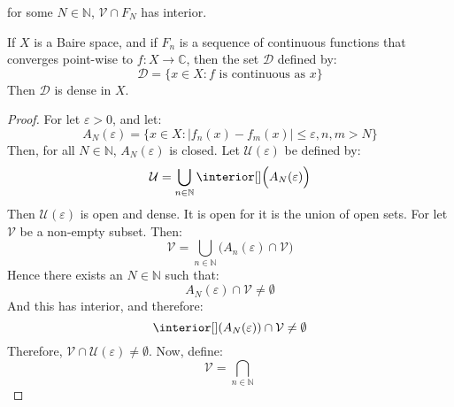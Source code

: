             for some $N\in\mathbb{N}$, $\mathcal{V}\cap{F}_{N}$ has
            interior.
            \begin{theorem}
            If $X$ is a Baire space, and if
            $F_{n}$ is a sequence of continuous functions that
            converges point-wise to $f:X\rightarrow\mathbb{C}$, then
            the set $\mathcal{D}$ defined by:
            \begin{equation}
                \mathcal{D}=
                    \{x\in{X}:\textrm{$f$ is continuous as $x$}\}
            \end{equation}
            Then $\mathcal{D}$ is dense in $X$.
        \end{theorem}
            \begin{proof}
            For let $\varepsilon>0$, and let:
            \begin{equation}
                A_{N}(\varepsilon)=
                \{x\in{X}:|f_{n}(x)-f_{m}(x)|\leq\varepsilon,n,m>N\}
            \end{equation}
            Then, for all $N\in\mathbb{N}$, $A_{N}(\varepsilon)$ is
            closed. Let $\mathcal{U}(\varepsilon)$ be defined by:
            \begin{equation}
                \mathcal{U}=\bigcup_{n\in\mathbb{N}}
                    \interior[]\Big(A_{N}(\varepsilon)\Big)
            \end{equation}
            Then $\mathcal{U}(\varepsilon)$ is open and dense. It
            is open for it is the union of open sets. For let
            $\mathcal{V}$ be a non-empty subset. Then:
            \begin{equation}
                \mathcal{V}=\bigcup_{n\in\mathbb{N}}
                    \Big(A_{n}(\varepsilon)\cap\mathcal{V}\Big)
            \end{equation}
            Hence there exists an $N\in\mathbb{N}$ such that:
            \begin{equation}
                A_{N}(\varepsilon)\cap\mathcal{V}\ne\emptyset
            \end{equation}
            And this has interior, and therefore:
            \begin{equation}
                \interior[](A_{N}(\varepsilon))\cap\mathcal{V}\ne\emptyset
            \end{equation}
            Therefore,
            $\mathcal{V}\cap\mathcal{U}(\varepsilon)\ne\emptyset$.
            Now, define:
            \begin{equation}
                \mathcal{V}=\bigcap_{n\in\mathbb{N}}

\end{equation}
\end{proof}
